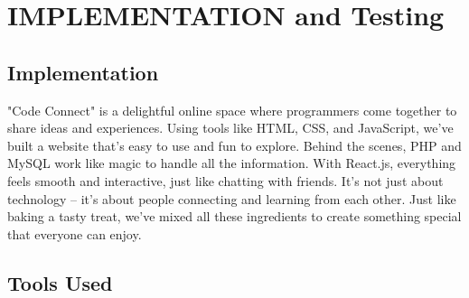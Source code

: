 \chapter{IMPLEMENTATION and Testing}
\section{Implementation}
"Code Connect" is a delightful online space where programmers come together to share ideas and experiences. Using tools like HTML, CSS, and JavaScript, we've built a website that's easy to use and fun to explore. Behind the scenes, PHP and MySQL work like magic to handle all the information. With React.js, everything feels smooth and interactive, just like chatting with friends. It's not just about technology – it's about people connecting and learning from each other. Just like baking a tasty treat, we've mixed all these ingredients to create something special that everyone can enjoy.





\section{Tools Used}

